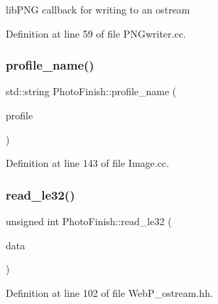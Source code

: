 lib\+P\+NG callback for writing to an ostream 



Definition at line 59 of file P\+N\+Gwriter.\+cc.

\mbox{\label{namespace_photo_finish_aada30164b0a54eded5ba1f7c5a92636a}} 
\subsubsection{\texorpdfstring{profile\+\_\+name()}{profile\_name()}}
{\footnotesize\ttfamily std\+::string Photo\+Finish\+::profile\+\_\+name (\begin{DoxyParamCaption}\item[{\hyperlink{class_c_m_s_1_1_profile_a7d5a80e1317d17dbfdf5ae69820ab08b}{C\+M\+S\+::\+Profile\+::ptr}}]{profile }\end{DoxyParamCaption})}



Definition at line 143 of file Image.\+cc.

\mbox{\label{namespace_photo_finish_a4c7726ccf8c39b9b415203df8a2cdbe9}} 
\subsubsection{\texorpdfstring{read\+\_\+le32()}{read\_le32()}}
{\footnotesize\ttfamily unsigned int Photo\+Finish\+::read\+\_\+le32 (\begin{DoxyParamCaption}\item[{const unsigned char $\ast$}]{data }\end{DoxyParamCaption})\hspace{0.3cm}{\ttfamily [inline]}}



Definition at line 102 of file Web\+P\+\_\+ostream.\+hh.

\mbox{\label{namespace_photo_finish_a10db9072258646ff5fac41ce9bd1ee52}} 
